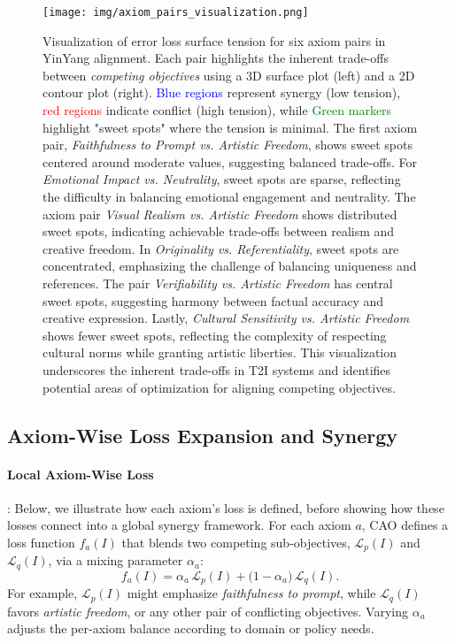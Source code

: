 \begin{figure*}[ht!]
    \centering
    \texttt{[image: img/axiom\_pairs\_visualization.png]}
    \caption{
        Visualization of error loss surface tension for six axiom pairs in YinYang alignment. Each pair highlights the inherent trade-offs between \emph{competing objectives} using a 3D surface plot (left) and a 2D contour plot (right). \textcolor{blue}{Blue regions} represent synergy (low tension), \textcolor{red}{red regions} indicate conflict (high tension), while \textcolor{green}{Green markers} highlight "sweet spots" where the tension is minimal. The first axiom pair, \textit{Faithfulness to Prompt vs. Artistic Freedom}, shows sweet spots centered around moderate values, suggesting balanced trade-offs. For \textit{Emotional Impact vs. Neutrality}, sweet spots are sparse, reflecting the difficulty in balancing emotional engagement and neutrality. The axiom pair \textit{Visual Realism vs. Artistic Freedom} shows distributed sweet spots, indicating achievable trade-offs between realism and creative freedom. In \textit{Originality vs. Referentiality}, sweet spots are concentrated, emphasizing the challenge of balancing uniqueness and references. The pair \textit{Verifiability vs. Artistic Freedom} has central sweet spots, suggesting harmony between factual accuracy and creative expression. Lastly, \textit{Cultural Sensitivity vs. Artistic Freedom} shows fewer sweet spots, reflecting the complexity of respecting cultural norms while granting artistic liberties. This visualization underscores the inherent trade-offs in T2I systems and identifies potential areas of optimization for aligning competing objectives.
    }
    \label{fig:axiom_pairs_tension}
    \vspace{-2mm}
\end{figure*}




\subsection{Axiom-Wise Loss Expansion and Synergy}

\paragraph{Local Axiom-Wise Loss}: Below, we illustrate how each axiom’s loss is defined, before showing how these losses connect into a global synergy framework. For each axiom \(a\), CAO defines a loss function \(f_a(I)\) that blends two competing sub-objectives, \(\mathcal{L}_p(I)\) and \(\mathcal{L}_q(I)\), via a mixing parameter \(\alpha_a\):
\[
f_a(I)
=
\alpha_a \,\mathcal{L}_p(I)
+
\bigl(1 - \alpha_a\bigr)\,\mathcal{L}_q(I).
\]
For example, \(\mathcal{L}_p(I)\) might emphasize \emph{faithfulness to prompt}, while \(\mathcal{L}_q(I)\) favors \emph{artistic freedom}, or any other pair of conflicting objectives. Varying \(\alpha_a\) adjusts the per-axiom balance according to domain or policy needs.


